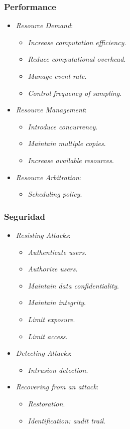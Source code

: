 \documentclass[]{article}
\begin{document}
\subsubsection{Performance}
\begin{itemize}
    \item \emph{Resource Demand}:
    \begin{itemize}
        \item \emph{Increase computation efficiency}.
        \item \emph{Reduce computational overhead}.
        \item \emph{Manage event rate}.
        \item \emph{Control frequency of sampling}.
    \end{itemize}
    \item \emph{Resource Management}:
    \begin{itemize}
        \item \emph{Introduce concurrency}.
        \item \emph{Maintain multiple copies}.
        \item \emph{Increase available resources}.
    \end{itemize}
    \item \emph{Resource Arbitration}:
    \begin{itemize}
        \item \emph{Scheduling policy}.
    \end{itemize}
\end{itemize}

\subsubsection{Seguridad}
\begin{itemize}
    \item \emph{Resisting Attacks}:
    \begin{itemize}
        \item \emph{Authenticate users}.
        \item \emph{Authorize users}.
        \item \emph{Maintain data confidentiality}.
        \item \emph{Maintain integrity}.
        \item \emph{Limit exposure}.
        \item \emph{Limit access}.
    \end{itemize}
    \item \emph{Detecting Attacks}:
    \begin{itemize}
        \item \emph{Intrusion detection}.
    \end{itemize}
    \item \emph{Recovering from an attack}:
    \begin{itemize}
        \item \emph{Restoration}.
        \item \emph{Identification: audit trail}.
    \end{itemize}
\end{itemize}
\end{document}
